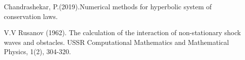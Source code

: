 \begin{thebibliography}{10}
Chandrashekar, P.(2019).Numerical methods for hyperbolic system of conservation laws.

V.V Rusanov (1962). The calculation of the interaction of non-stationary shock waves and obstacles. USSR Computational Mathematics and Mathematical Physics, 1(2), 304-320.
\end{thebibliography}